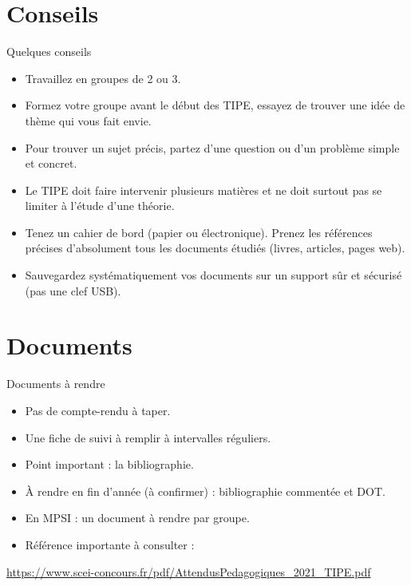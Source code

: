 \documentclass{beamer}
\begin{document}
\section{Conseils}
\begin{frame}{Quelques conseils}
    \begin{itemize}
        \item Travaillez en groupes de 2 ou 3.
        \item Formez votre groupe avant le début des TIPE, essayez de trouver une idée de thème qui vous fait envie. 
        \item Pour trouver un sujet précis, partez d'une question ou d'un problème simple et concret. 
        \item Le TIPE doit faire intervenir plusieurs matières et ne doit surtout pas se limiter à l'étude d'une théorie. 
        \item Tenez un cahier de bord (papier ou électronique). Prenez les références précises d'absolument tous les documents étudiés (livres, articles, pages web). 
        \item Sauvegardez systématiquement vos documents sur un support sûr et sécurisé (pas une clef USB). 
    \end{itemize}
\end{frame}

\section{Documents}
\begin{frame}{Documents à rendre}
    \begin{itemize}
        \item Pas de compte-rendu à taper. 
        \item Une fiche de suivi à remplir à intervalles réguliers. 
        \item Point important : la bibliographie. 
        \item À rendre en fin d'année (à confirmer) : bibliographie commentée et DOT. 
        \item En MPSI : un document à rendre par groupe. 
        \item Référence importante à consulter : 
    \end{itemize}

    \begin{center}
        \url{https://www.scei-concours.fr/pdf/AttendusPedagogiques_2021_TIPE.pdf}
    \end{center}
\end{frame}
\end{document}
